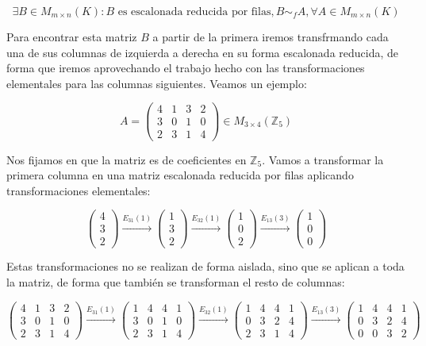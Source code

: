 \[\exists B \in M_{m \times n}(K) : B \text{ es escalonada reducida por filas}, B \sim_f A, \forall A \in M_{m \times n}(K)\]

Para encontrar esta matriz $B$ a partir de la primera iremos transfrmando cada una de sus columnas de izquierda a derecha en su forma escalonada reducida, de forma que iremos aprovechando el trabajo hecho con las transformaciones elementales para las columnas siguientes.
Veamos un ejemplo:

\[
	A =
	\begin{pmatrix}
		4 & 1 & 3 & 2 \\
		3 & 0 & 1 & 0 \\
		2 & 3 & 1 & 4
	\end{pmatrix}
	\in M_{3 \times 4}(\mathbb{Z}_5)
\]

Nos fijamos en que la matriz es de coeficientes en $\mathbb{Z}_5$.
Vamos a transformar la primera columna en una matriz escalonada reducida por filas aplicando transformaciones elementales:

\[
	\begin{pmatrix}
		4 \\
		3 \\
		2
	\end{pmatrix}
	\xrightarrow{E_{31}(1)}
	\begin{pmatrix}
		1 \\
		3 \\
		2
	\end{pmatrix}
	\xrightarrow{E_{32}(1)}
	\begin{pmatrix}
		1 \\
		0 \\
		2
	\end{pmatrix}
	\xrightarrow{E_{13}(3)}
	\begin{pmatrix}
		1 \\
		0 \\
		0
	\end{pmatrix}
\]

Estas transformaciones no se realizan de forma aislada, sino que se aplican a toda la matriz, de forma que también se transforman el resto de columnas:

\[
	\begin{pmatrix}
		4 & 1 & 3 & 2 \\
		3 & 0 & 1 & 0 \\
		2 & 3 & 1 & 4
	\end{pmatrix}
	\xrightarrow{E_{31}(1)}
	\begin{pmatrix}
		1 & 4 & 4 & 1 \\
		3 & 0 & 1 & 0 \\
		2 & 3 & 1 & 4
	\end{pmatrix}
	\xrightarrow{E_{32}(1)}
	\begin{pmatrix}
		1 & 4 & 4 & 1 \\
		0 & 3 & 2 & 4 \\
		2 & 3 & 1 & 4
	\end{pmatrix}
	\xrightarrow{E_{13}(3)}
	\begin{pmatrix}
		1 & 4 & 4 & 1 \\
		0 & 3 & 2 & 4 \\
		0 & 0 & 3 & 2
	\end{pmatrix}
\]

